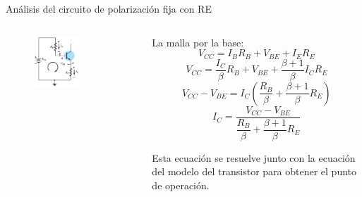 \documentclass[t,aspectratio=169]{beamer}
\begin{document}
\begin{frame}{Análisis del circuito de polarización fija con RE}

\begin{columns}
\begin{column}{0.5\textwidth}

\begin{figure}
    \centering
    \includegraphics[width=0.6\textwidth]{figures/polarizacion_fija_RE_analisis.png}
\end{figure}

\end{column}
\begin{column}{0.5\textwidth}

La malla por la base:
%
\[ V_{CC} = I_B R_B + V_{BE} + I_E R_E \]
%
\[ V_{CC} = \dfrac{I_C}{\beta} R_B + V_{BE} + \dfrac{\beta + 1}{\beta} I_C R_E \]
%
\[ V_{CC} - V_{BE} = I_C \left( \dfrac{R_B}{\beta}  + \dfrac{\beta + 1}{\beta} R_E \right)  \]
%
\[ I_C = \dfrac{V_{CC} - V_{BE}}{ \dfrac{R_B}{\beta}  + \dfrac{\beta + 1}{\beta} R_E }  \]

Esta ecuación se resuelve junto con la ecuación del modelo del transistor para obtener el punto de operación.

\end{column}
\end{columns}

\end{frame}
\end{document}
